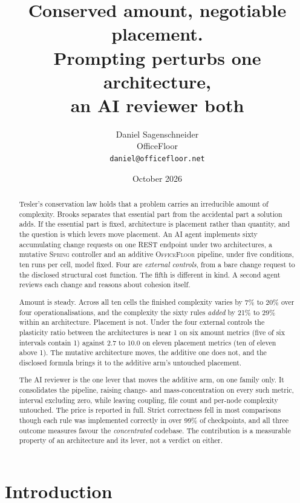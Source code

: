 \documentclass[11pt,a4paper]{article}
\title{\bfseries Conserved amount, negotiable placement.\\
Prompting perturbs one architecture,\\
an AI reviewer both}
\author{Daniel Sagenschneider\\\small OfficeFloor\\\small\texttt{daniel@officefloor.net}\doiline}
\date{October 2026}
\newcommand{\sprg}{\textsc{Spring}}
\newcommand{\offl}{\textsc{OfficeFloor}}
\begin{document}
\maketitle

\begin{abstract}
\noindent
Tesler's conservation law holds that a problem carries an irreducible amount of
complexity. Brooks separates that essential part from the accidental part a
solution adds. If the essential part is fixed, architecture is placement rather
than quantity, and the question is which levers move placement. An AI
agent implements sixty accumulating change requests on one REST endpoint under
two architectures, a mutative \sprg{} controller and an additive \offl{} pipeline,
under five conditions, ten runs per cell, model fixed.
Four are \emph{external controls}, from a bare change request to the
disclosed structural cost function. The fifth is different in kind.
A second agent reviews each change and reasons about cohesion itself.

Amount is steady. Across all ten cells the finished complexity varies by 7\% to
20\% over four operationalisations, and the complexity the sixty rules
\emph{added} by 21\% to 29\% within an architecture. Placement is not. Under the
four external controls the plasticity ratio between the architectures is near 1 on
six amount metrics (five of six intervals contain 1) against 2.7 to 10.0 on eleven
placement metrics (ten of eleven above 1). The mutative architecture moves, the
additive one does not, and the disclosed formula brings it to the additive arm's
untouched placement.

The AI reviewer is the one lever that moves the additive arm, on one family only.
It consolidates the pipeline, raising change- and mass-concentration on every such
metric, interval excluding zero, while leaving coupling, file count and
per-node complexity untouched. The price is reported in full. Strict correctness
fell in most comparisons though each rule was implemented correctly in over 99\%
of checkpoints, and all three outcome measures favour the \emph{concentrated}
codebase. The contribution is a measurable property of an architecture and its
lever, not a verdict on either.
\end{abstract}

\section{Introduction}
\end{document}
